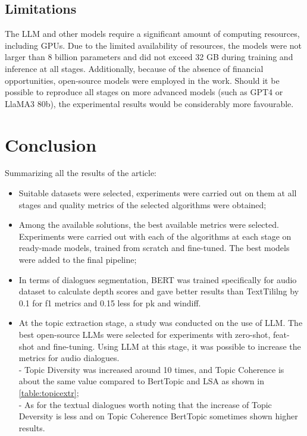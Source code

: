 \documentclass[PMI,VKR]{HSEUniversity}
\begin{document}
\section{Limitations}

The LLM and other models require a significant amount of computing resources, including GPUs. Due to the limited availability of resources, the models were not larger than 8 billion parameters and did not exceed 32 GB during training and inference at all stages. 
Additionally, because of the absence of financial opportunities, open-source models were employed in the work. Should it be possible to reproduce all stages on more advanced models (such as GPT4 or LlaMA3 80b), the experimental results would be considerably more favourable.

\chapter*{Conclusion}

Summarizing all the results of the article:
\begin{itemize}
    \item Suitable datasets were selected, experiments were carried out on them at all stages and quality metrics of the selected algorithms were obtained;
    \item Among the available solutions, the best available metrics were selected. Experiments were carried out with each of the algorithms at each stage on ready-made models, trained from scratch and fine-tuned. The best models were added to the final pipeline;
    \item In terms of dialogues segmentation, BERT was trained specifically for audio dataset to calculate depth scores and gave better results than TextTililng by 0.1 for f1 metrics and 0.15 less for pk and windiff.
    \item At the topic extraction stage, a study was conducted on the use of LLM. The best open-source LLMs were selected for experiments with zero-shot, feat-shot and fine-tuning. Using LLM at this stage, it was possible to increase the metrics for audio dialogues. \\
     - Topic Diversity was increased around 10 times, and Topic Coherence is about the same value compared to BertTopic and LSA as shown in \ref{table:topicextr}; \\
     - As for the textual dialogues worth noting that the increase of Topic Deversity is less and on Topic Coherence BertTopic sometimes shown higher results.
\end{itemize}

\putbibliography
\nocite{hydro:2023}
\nocite{sesseg:2016}
\nocite{todbert:2020}
\nocite{topaware:2020}
\nocite{Plaquet23:2023}
\nocite{dialsystem:2018}
\nocite{jointmdl:2020}
\nocite{clusterllm:2023}
\nocite{atnm:2023}
\nocite{plsa:2013}
\end{document}
